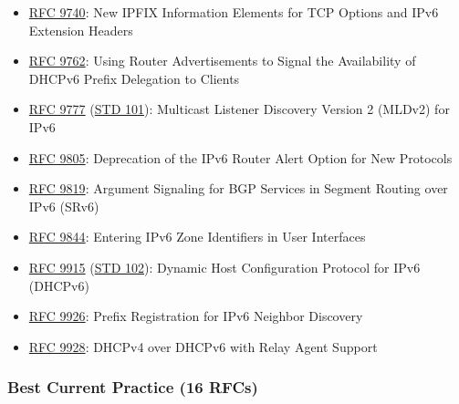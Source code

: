 \documentclass[
]{article}
\begin{document}
\begin{itemize}
\item
  \href{https://www.rfc-editor.org/info/rfc9740}{RFC 9740}: New IPFIX
  Information Elements for TCP Options and IPv6 Extension Headers
\item
  \href{https://www.rfc-editor.org/info/rfc9762}{RFC 9762}: Using Router
  Advertisements to Signal the Availability of DHCPv6 Prefix Delegation
  to Clients
\item
  \href{https://www.rfc-editor.org/info/rfc9777}{RFC 9777}
  (\href{https://www.rfc-editor.org/info/std101}{STD 101}): Multicast
  Listener Discovery Version 2 (MLDv2) for IPv6
\item
  \href{https://www.rfc-editor.org/info/rfc9805}{RFC 9805}: Deprecation
  of the IPv6 Router Alert Option for New Protocols
\item
  \href{https://www.rfc-editor.org/info/rfc9819}{RFC 9819}: Argument
  Signaling for BGP Services in Segment Routing over IPv6 (SRv6)
\item
  \href{https://www.rfc-editor.org/info/rfc9844}{RFC 9844}: Entering
  IPv6 Zone Identifiers in User Interfaces
\item
  \href{https://www.rfc-editor.org/info/rfc9915}{RFC 9915}
  (\href{https://www.rfc-editor.org/info/std102}{STD 102}): Dynamic Host
  Configuration Protocol for IPv6 (DHCPv6)
\item
  \href{https://www.rfc-editor.org/info/rfc9926}{RFC 9926}: Prefix
  Registration for IPv6 Neighbor Discovery
\item
  \href{https://www.rfc-editor.org/info/rfc9928}{RFC 9928}: DHCPv4 over
  DHCPv6 with Relay Agent Support
\end{itemize}

\subsubsection{Best Current Practice (16
RFCs)}\label{best-current-practice-16-rfcs}
\end{document}
